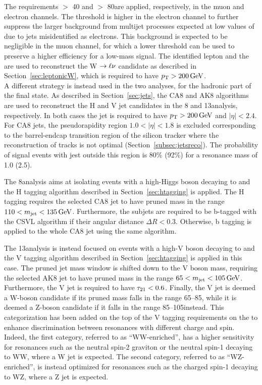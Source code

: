The requirements \ETmiss $>$ 40 and $>$ 80\GeV are applied, respectively, in the muon and electron channels.
The threshold is higher in the electron channel to further suppress the larger background from multijet processes expected at low values of \ETmiss due to jets misidentified as electrons.
This background is expected to be negligible in the muon channel, for which a lower \ETmiss threshold can be used to preserve a higher efficiency for a low-mass signal.
The identified lepton and the \ETmiss are used to reconstruct the W $\rightarrow\ell\nu$ candidate as described in Section~\ref{sec:leptonicW},
which is required to have $p_{\mathrm{T}} > 200\,\text{Ge\hspace{-.08em}V}$.\\

A different strategy is instead used in the two analyses, for the hadronic part of the final state.
As described in Section~\ref{sec:jets}, the CA8 and AK8 algorithms are used to reconstruct the H and V jet candidates in the 8 and 13\TeV analysis, respectively.
In both cases the jet is required to have $p_{\mathrm{T}} > 200\,\text{Ge\hspace{-.08em}V}$ and $|\eta| < 2.4$. %
For CA8 jets, the pseudorapidity region $1.0 < |\eta| < 1.8$ is excluded corresponding to the barrel-endcap transition region of the silicon tracker where the reconstruction of tracks is not optimal (Section~\ref{subsec:jetsreco}).
The probability of signal events with jest outside this region is 80\% (92\%) for a resonance mass of 1.0 (2.5)\TeV.

The 8\TeV analysis aims at isolating events with a high-\pt Higgs boson decaying to \bbbar and the H tagging algorithm described in Section~\ref{sec:htagging} is applied.
The H tagging requires the selected CA8 jet to have pruned mass in the range $110 < m_{\text{jet}} < 135\,\text{Ge\hspace{-.08em}V}$. Furthermore, the subjets are required to be b-tagged with the CSVL algorithm if their angular distance $\Delta R < 0.3$.
Otherwise, b tagging is applied to the whole CA8 jet using the same algorithm.

The 13\TeV analysis is instead focused on events with a high-\pt V boson decaying to \qqbar and the V tagging algorithm described in Section~\ref{sec:htagging} is applied in this case.
The pruned jet mass window is shifted down to the V boson mass, requiring the selected AK8 jet to have pruned mass in the range $65 < m_{\text{jet}} < 105\,\text{Ge\hspace{-.08em}V}$.
Furthermore, the V jet is required to have $\tau_{21} < 0.6$.
Finally, the V jet is deemed a W-boson candidate if its pruned mass falls in the range 65--85\GeV, while it is deemed a Z-boson candidate if it falls in the range 85--105\GeV instead.
This categorization has been added on the top of the V tagging requirements on the \mJ to enhance discrimination between resonances with different charge and spin. 
Indeed, the first category, referred to as  ``WW-enriched'', has a higher sensitivity for resonances such as the neutral spin-2 graviton or the neutral spin-1 \Zpr decaying to WW, where a W jet is expected.
The second category, referred to as ``WZ-enriched'', is instead optimized for resonances such as the charged spin-1 \Wpr decaying to WZ, where a Z jet is expected.\\

